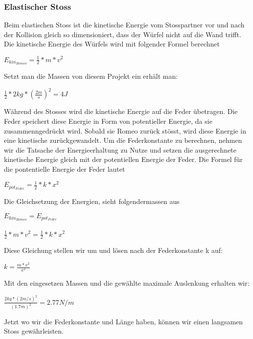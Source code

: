 \documentclass[../main.tex]{subfiles}
\begin{document}
\subsubsection{Elastischer Stoss}
Beim elastischen Stoss ist die kinetische Energie vom Stosspartner vor und nach der Kollision
gleich %
so dimensioniert, dass der Würfel nicht auf die Wand trifft.
Die kinetische Energie des Würfels wird mit folgender Formel berechnet %
\begin{mdframed}
$E_{kin_{Romeo}}=\frac{1}{2} * m * v^{2}$
\end{mdframed}
Setzt man die Massen von diesem Projekt ein erhält man:
\begin{mdframed}
$\frac{1}{2} * 2kg * (\frac{2m}{s})^{2} = 4J$
\end{mdframed}
Während des Stosses wird die kinetische Energie auf die Feder übetragen. Die Feder speichert diese
Energie in Form von potentieller Energie, da sie zusammenngedrückt wird. Sobald sie Romeo zurück
stösst, wird diese Energie in eine kinetische zurückgewandelt.\newline
Um die Federkonstante zu berechnen, nehmen wir die Tatsache der Energieerhaltung zu Nutze und
setzen die ausgerechnete kinetische Energie gleich mit der potentiellen Energie der Feder.\newline
Die Formel für die pontentielle Energie der Feder lautet%
\begin{mdframed}
$E_{pot_{Feder}}=\frac{1}{2} * k * x^{2}$
\end{mdframed}
Die Gleichsetzung der Energien, sieht folgendermassen aus%
\begin{mdframed}
$E_{kin_{Romeo}}=E_{pot_{Feder}}$\\\\
$\frac{1}{2} * m * v^{2} = \frac{1}{2} * k * x^{2}$
\end{mdframed}
Diese Gleichung stellen wir um und lösen nach der Federkonstante k auf:
\begin{mdframed}
$ k=\frac{m * v^{2}}{x^{2}}$
\end{mdframed}
Mit den eingesetzen Massen und die gewählte maximale Auslenkung erhalten wir:
\begin{mdframed}
$\frac{2kg*(2m/s)^{2}}{(1.7m)^{2}} = 2.77N/m$
\end{mdframed}
Jetzt wo wir die Federkonstante und Länge haben, können wir einen langsamen Stoss gewährleisten.
\newpage
\end{document}
